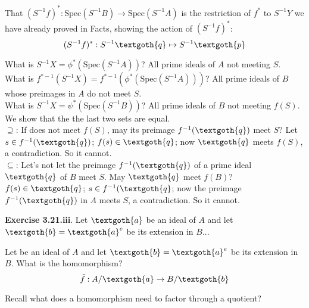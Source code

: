 \documentclass{article}
\begin{document}

\noindent
That $(S^{-1}f)^* : \textrm{Spec}(S^{-1}B) \rightarrow \textrm{Spec}(S^{-1}A)$ is the restriction of $f^*$ to $S^{-1}Y$ we have already proved in Facts, showing the action of $(S^{-1}f)^*$:
\[
    (S^{-1}f)^*: S^{-1}\textgoth{q} \mapsto S^{-1}\textgoth{p}
\]

\noindent
What is $S^{-1}X = \phi^*(\textrm{Spec}(S^{-1}A))$? All prime ideals of $A$ not meeting $S$. \\ 
What is $f^{*-1}(S^{-1}X) = f^{*-1}(\phi^*(\textrm{Spec}(S^{-1}A)))$? All prime ideals of $B$ whose preimages in $A$ do not meet $S$. \\
What is $S^{-1}X = \psi^*(\textrm{Spec}(S^{-1}B))$? All prime ideals of $B$ not meeting $f(S)$. \\ 
We show that the the last two sets are equal.\\
$\supseteq$: If  does not meet $f(S)$, may its preimage $f^{-1}(\textgoth{q})$ meet $S$? Let $s \in f^{-1}(\textgoth{q})$; $f(s) \in \textgoth{q}$; now $\textgoth{q}$ meets $f(S)$, a contradiction. So it cannot. \\
$\subseteq$: Let's not let the preimage $f^{-1}(\textgoth{q})$ of a prime ideal $\textgoth{q}$ of
$B$ meet $S$. May $\textgoth{q}$ meet $f(B)$? $f(s) \in \textgoth{q}$; $s\in f^{-1}(\textgoth{q}$; now the preimage $f^{-1}(\textgoth{q})$ in $A$ meets $S$, a contradiction. So it cannot. 


\vspace*{10px}

\textbf{Exercise 3.21.iii}. 
Let $\textgoth{a}$ be an ideal of $A$ and let $\textgoth{b} = \textgoth{a}^e$ be its extension in $B$...

\vspace*{10px} 

Let  be an ideal of $A$ and let $\textgoth{b} = \textgoth{a}^e$ be its extension in $B$. What is the homomorphism?
\[
  \tilde{f}: A/\textgoth{a} \rightarrow B/\textgoth{b} 
\]

\noindent
Recall what does a homomorphism need to factor through a quotient?
\end{document}
